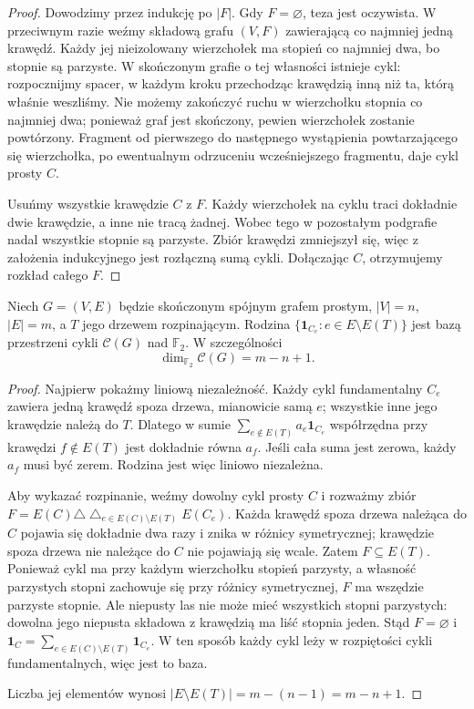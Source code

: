 \begin{proof}
Dowodzimy przez indukcję po $|F|$. Gdy $F=\varnothing$,
teza jest oczywista. W przeciwnym razie
weźmy składową grafu $(V,F)$ zawierającą
co najmniej jedną krawędź. Każdy jej
nieizolowany wierzchołek ma stopień co najmniej
dwa, bo stopnie są parzyste. W skończonym
grafie o tej własności istnieje cykl:
rozpocznijmy spacer, w każdym kroku przechodząc
krawędzią inną niż ta, którą właśnie weszliśmy.
Nie możemy zakończyć ruchu w wierzchołku
stopnia co najmniej dwa; ponieważ graf jest
skończony, pewien wierzchołek zostanie
powtórzony. Fragment od pierwszego do
następnego wystąpienia powtarzającego się
wierzchołka, po ewentualnym odrzuceniu
wcześniejszego fragmentu, daje cykl prosty $C$.

Usuńmy wszystkie krawędzie $C$ z $F$.
Każdy wierzchołek na cyklu traci dokładnie
dwie krawędzie, a inne nie tracą żadnej.
Wobec tego w pozostałym podgrafie nadal
wszystkie stopnie są parzyste. Zbiór
krawędzi zmniejszył się, więc z założenia
indukcyjnego jest rozłączną sumą cykli.
Dołączając $C$, otrzymujemy rozkład całego $F$.
\end{proof}

\begin{twierdzenie}
Niech $G=(V,E)$ będzie skończonym spójnym
grafem prostym, $|V|=n$, $|E|=m$,
a $T$ jego drzewem rozpinającym. Rodzina
$\{\mathbf1_{C_e}:e\in E\setminus E(T)\}$
jest bazą przestrzeni cykli $\mathcal C(G)$
nad $\mathbb F_2$. W szczególności
\[
\dim_{\mathbb F_2}\mathcal C(G)=m-n+1.
\]
\end{twierdzenie}

\begin{proof}
Najpierw pokażmy liniową niezależność.
Każdy cykl fundamentalny $C_e$ zawiera
jedną krawędź spoza drzewa, mianowicie
samą $e$; wszystkie inne jego krawędzie
należą do $T$. Dlatego w sumie
$\sum_{e\notin E(T)}a_e\mathbf1_{C_e}$
współrzędna przy krawędzi $f\notin E(T)$
jest dokładnie równa $a_f$. Jeśli cała
suma jest zerowa, każdy $a_f$ musi być
zerem. Rodzina jest więc liniowo niezależna.

Aby wykazać rozpinanie, weźmy dowolny
cykl prosty $C$ i rozważmy zbiór
$F=E(C)\triangle\bigtriangleup_{e\in E(C)\setminus E(T)} E(C_e)$.
Każda krawędź spoza drzewa należąca do $C$
pojawia się dokładnie dwa razy i znika w
różnicy symetrycznej; krawędzie spoza
drzewa nie należące do $C$ nie pojawiają się
wcale. Zatem $F\subseteq E(T)$.
Ponieważ cykl ma przy każdym wierzchołku
stopień parzysty, a własność parzystych
stopni zachowuje się przy różnicy symetrycznej,
$F$ ma wszędzie parzyste stopnie.
Ale niepusty las nie może mieć wszystkich
stopni parzystych: dowolna jego niepusta
składowa z krawędzią ma liść stopnia jeden.
Stąd $F=\varnothing$ i
$\mathbf1_C=\sum_{e\in E(C)\setminus E(T)}\mathbf1_{C_e}$.
W ten sposób każdy cykl leży w rozpiętości
cykli fundamentalnych, więc jest to baza.

Liczba jej elementów wynosi
$|E\setminus E(T)|=m-(n-1)=m-n+1$.
\end{proof}

